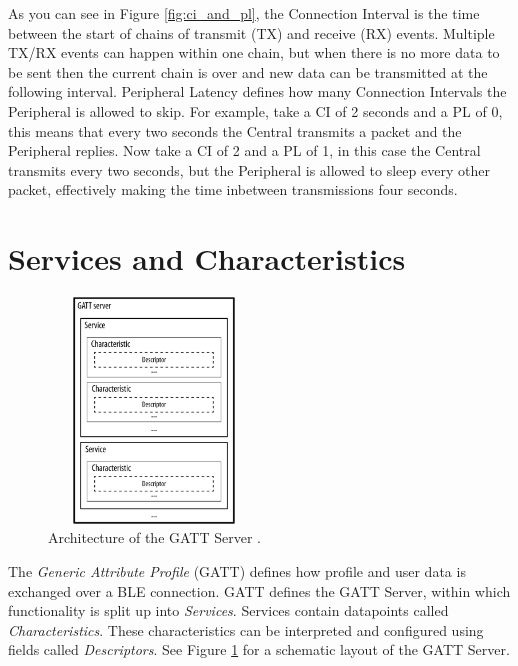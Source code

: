 As you can see in Figure \ref{fig:ci_and_pl}, the Connection Interval is the time between the start of chains of transmit (TX) and receive (RX) events. Multiple TX/RX events can happen within one chain, but when there is no more data to be sent then the current chain is over and new data can be transmitted at the following interval. Peripheral Latency defines how many Connection Intervals the Peripheral is allowed to skip. For example, take a CI of 2 seconds and a PL of 0, this means that every two seconds the Central transmits a packet and the Peripheral replies. Now take a CI of 2 and a PL of 1, in this case the Central transmits every two seconds, but the Peripheral is allowed to sleep every other packet, effectively making the time inbetween transmissions four seconds. 

\section{Services and Characteristics}
\begin{figure}[]
    \centering
    \includegraphics[width=0.5\textwidth,height=6cm,keepaspectratio=true]{images/gatt_service}
    \caption{
        Architecture of the GATT Server \cite{townsend_cufi}.
    }
    \label{fig:gatt_server}
\end{figure}
The \textit{Generic Attribute Profile} (GATT) defines how profile and user data is exchanged over a BLE connection. GATT defines the GATT Server, within which functionality is split up into \textit{Services}. Services contain datapoints called \textit{Characteristics}. These characteristics can be interpreted and configured using fields called \textit{Descriptors}. See Figure \ref{fig:gatt_server} for a schematic layout of the GATT Server.

